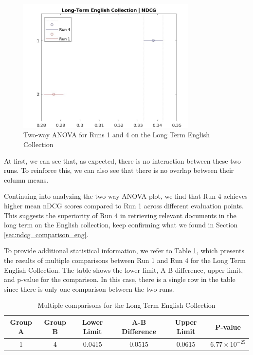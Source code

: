 \begin{figure}[!h]
\centering
\includegraphics[width=0.8\textwidth]{figure/StatisticalAnalysis/ANOVA 2/ndcg-lt-en.jpeg}
\caption{Two-way ANOVA for Runs 1 and 4 on the Long Term English Collection}
\label{fig:lt_anova_eng}
\end{figure}

At first, we can see that, as expected, there is no interaction between these two runs. To reinforce this, we can also see that there is no overlap between their column means.

Continuing into analyzing the two-way \ac{ANOVA} plot, we find that Run 4 achieves higher mean \ac{nDCG} scores compared to Run 1 across different evaluation points. 
This suggests the superiority of Run 4 in retrieving relevant documents in the long term on the English collection, keep confirming what we found in Section \ref{sec:ndcg_comparison_eng}. 

To provide additional statistical information, we refer to Table \ref{table:lt_anova_eng}, which presents the results of multiple comparisons between Run 1 and Run 4 for the Long Term English Collection. 
The table shows the lower limit, A-B difference, upper limit, and p-value for the comparison. 
In this case, there is a single row in the table since there is only one comparison between the two runs.

\begin{table}[!h]
    \centering
    \caption{Multiple comparisons for the Long Term English Collection}
    \label{table:lt_anova_eng}
    \begin{tabular}{cccccc}
    \hline
    Group A & Group B & Lower Limit & A-B Difference & Upper Limit & P-value \\
    \hline
    1 & 4 & 0.0415 & 0.0515 & 0.0615 & $6.77 \times 10^{-25}$ \\
    \hline
    \end{tabular}
\end{table}
    
